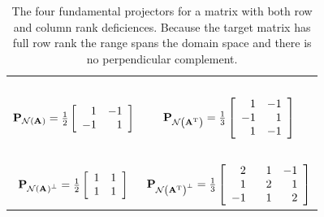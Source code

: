 \begin{table}[htdp]
\begin{center}
\begin{tabular}{cc}
\ \\
 $\projna = \frac{1}{2}\mat{rr}{1&-1\\-1&1}$ & $\projnat = \frac{1}{3}\Aexample$ \\
\ \\
 $\projnap = \frac{1}{2}\mat{rr}{1&1\\1&1}$ & $\projnatp = \frac{1}{3}\mat{rrr}{2&1&-1\\1&\phantom{-}2&1\\-1&1&2}$ \\[10pt]
\end{tabular}
\end{center}
\label{tab:proj:c}
\caption{The four fundamental projectors for a matrix with both row and column rank deficiences. Because the target matrix has full row rank the range spans the domain space and  there is no perpendicular complement.}
\end{table}
\clearpage
\endinput

